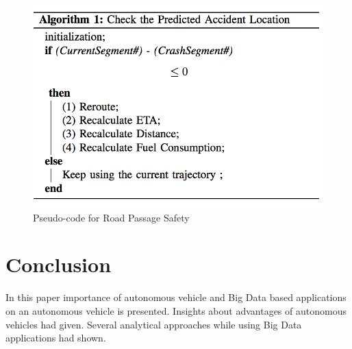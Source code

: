 \documentclass{acm_proc_article-sp}
\begin{document}
\begin{figure}[!ht]
  \centering
      \includegraphics[width=1.0\columnwidth]{images/picture10.png}
  \caption{Pseudo-code for Road Passage Safety}\label{F:pseudo-code}
\end{figure}

\section{Conclusion}
    In this paper importance of autonomous vehicle and Big Data based applications on an autonomous vehicle is presented. Insights about advantages of autonomous vehicles had given. Several analytical approaches while using Big Data applications had shown.






\end{document}
